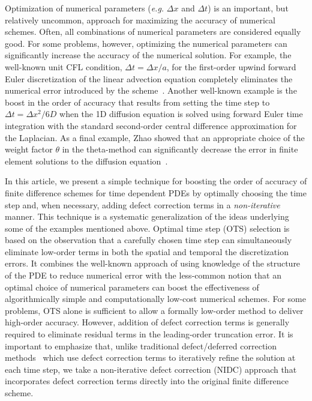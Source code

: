 \documentclass[fleqn,12pt,twoside]{article}
\def\dt{\Delta t}
\def\dx{\Delta x}
\def\eg{\emph{e.g. }}
\begin{document}
Optimization of numerical parameters (\eg $\dx$ and $\dt$) is an important, 
but relatively uncommon, approach for maximizing the accuracy of numerical 
schemes.  Often, all combinations of numerical parameters are considered 
equally good.  For some problems, however, optimizing the numerical parameters 
can significantly increase the accuracy of the numerical solution.  For 
example, the well-known unit CFL condition, $\dt = \dx/a$, for the first-order 
upwind forward Euler discretization of the linear advection equation 
completely eliminates the numerical error introduced by the 
scheme~\cite{leveque_book_2002}.  Another well-known example is the boost in 
the order of accuracy that results from setting the time step to 
$\dt = \dx^2/6D$ when the 1D diffusion equation is solved using forward Euler 
time integration with the standard second-order central difference 
approximation for the Laplacian.  As a final example, Zhao showed that an 
appropriate choice of the weight factor $\theta$ in the theta-method can 
significantly decrease the error in finite element solutions to the diffusion 
equation~\cite{zhao_2006}. 

In this article, we present a simple technique for boosting the order of 
accuracy of finite difference schemes for time dependent PDEs by optimally 
choosing the time step and, when necessary, adding defect correction terms
in a \emph{non-iterative} manner.  This technique is a systematic 
generalization of the ideas underlying some of the examples mentioned above.
Optimal time step (OTS) selection is based on the observation that a carefully 
chosen time step can simultaneously eliminate low-order terms in both the
spatial and temporal the discretization errors.  It combines the well-known 
approach of using knowledge of the structure of the PDE to reduce numerical 
error with the less-common notion that an optimal choice of numerical 
parameters can boost the effectiveness of algorithmically simple and 
computationally low-cost numerical schemes.  For some problems, OTS alone is 
sufficient to allow a formally low-order method to deliver high-order 
accuracy.  However, addition of defect correction terms is generally required 
to eliminate residual terms in the leading-order truncation error.  It is 
important to emphasize that, unlike traditional defect/deferred correction 
methods~\cite{pereyra_1968,stetter_1978,gustafsson_2002,kress_2002,kress_2006} 
which use defect correction terms to iteratively refine the solution at 
each time step, we take a non-iterative defect correction (NIDC) approach
that incorporates defect correction terms directly into the original finite 
difference scheme.
\end{document}
